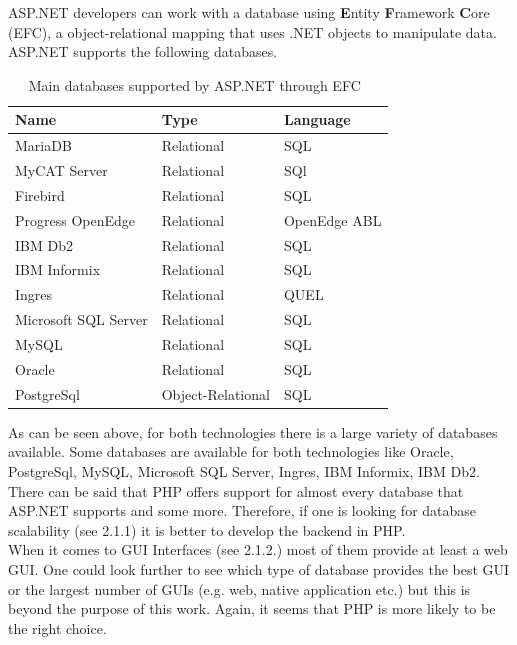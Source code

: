 \documentclass[11]{article}
\begin{document}
		ASP.NET developers can work with a database using \textbf{E}ntity \textbf{F}ramework \textbf{C}ore (EFC), a object-relational mapping that uses .NET objects to manipulate data. ASP.NET supports the following databases.

		\begin{table}[H]
			\caption{Main databases supported by ASP.NET through EFC~\citep{AspDbs}}
			  \centering
				\begin{tabular}{|l|l|l|}
					\hline
					\textbf{Name} & \textbf{Type} & \textbf{Language}\\
					\hline
					MariaDB & Relational & SQL\\
					\hline
					MyCAT Server& Relational & SQl\\
					\hline
					Firebird & Relational & SQL\\
					\hline 
					Progress OpenEdge & Relational & OpenEdge ABL\\
					\hline 
					IBM Db2 & Relational & SQL\\
					\hline 
					IBM Informix & Relational & SQL\\
					\hline 
					Ingres & Relational & QUEL\\
					\hline 
					Microsoft SQL Server & Relational & SQL\\
					\hline 
					MySQL& Relational & SQL\\
					\hline 
					Oracle  & Relational & SQL\\
					\hline 
					PostgreSql  & Object-Relational & SQL\\
					\hline 
				\end{tabular}

		\end{table}


	As can be seen above, for both technologies there is a large variety of databases available. Some databases are available for both technologies like Oracle, PostgreSql, MySQL, Microsoft SQL Server, Ingres, IBM Informix, IBM Db2. There can be said that PHP offers support for almost every database that ASP.NET supports and some more. Therefore, if one is looking for database scalability (see 2.1.1) it is better to develop the backend in PHP.\\
	\indent
	When it comes to GUI Interfaces (see 2.1.2.) most of them provide at least a web GUI. One could look further to see which type of database provides the best GUI or the largest number of GUIs (e.g. web, native application etc.) but this is beyond the purpose of this work. Again, it seems that PHP is more likely to be the right choice.\\
\end{document}
